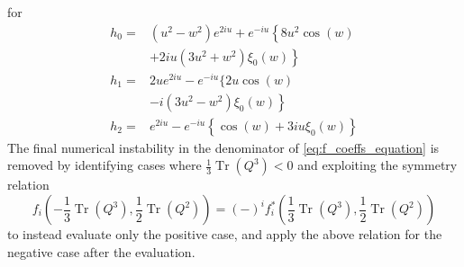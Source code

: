 \documentclass[a4paper,10pt]{book}
\begin{document}
for 
\begin{equation}
\begin{aligned}
h_{0}=&\left(u^{2}-w^{2}\right) e^{2 i u}+e^{-i u}\left\{8 u^{2} \cos (w)\right.\\
&\left.+2 i u\left(3 u^{2}+w^{2}\right) \xi_{0}(w)\right\} \\
h_{1}=& 2 u e^{2 i u}-e^{-i u}\{2 u \cos (w)\\
&\left.-i\left(3 u^{2}-w^{2}\right) \xi_{0}(w)\right\} \\
h_{2}=& e^{2 i u}-e^{-i u}\left\{\cos (w)+3 i u \xi_{0}(w)\right\}
\end{aligned}
\end{equation}
The final numerical instability in the denominator of \eqref{eq:f_coeffs_equation} is removed by identifying cases where $\frac{1}{3} \operatorname{Tr}\left(Q^{3}\right)<0$ and exploiting the symmetry relation 
$$
f_{i}\left(-\frac{1}{3} \operatorname{Tr}\left(Q^{3}\right), \frac{1}{2} \operatorname{Tr}\left(Q^{2}\right)\right)=(-)^{i} f_{i}^{*}\left(\frac{1}{3} \operatorname{Tr}\left(Q^{3}\right), \frac{1}{2} \operatorname{Tr}\left(Q^{2}\right)\right)
$$
to instead evaluate only the positive case, and apply the above relation for the negative case after the evaluation.
\end{document}
